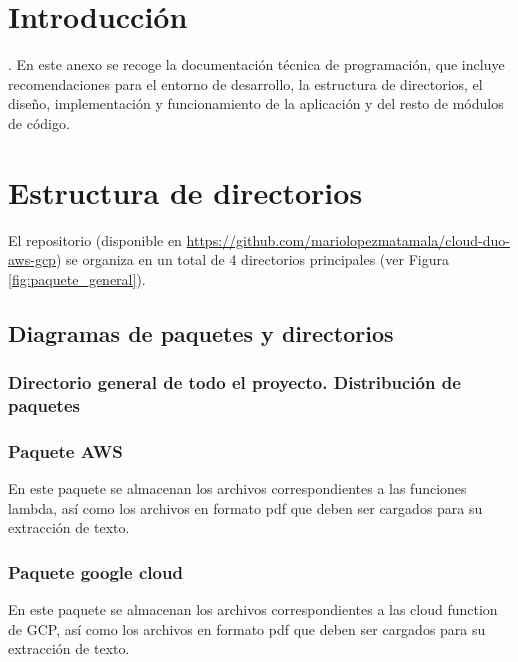 
\section{Introducción}. 
 En este anexo se recoge la documentación técnica de programación, que incluye recomendaciones para el entorno de desarrollo, la estructura de directorios,  el diseño, implementación y funcionamiento de la aplicación y del resto de módulos de código.

\section{Estructura de directorios}
El repositorio (disponible en \url{https://github.com/mariolopezmatamala/cloud-duo-aws-gcp}) se organiza en un total de 4 directorios principales (ver Figura \ref{fig:paquete_general}).

\subsection{Diagramas de paquetes y directorios}

\subsubsection{Directorio general de todo el proyecto. Distribución de paquetes}


\subsubsection{Paquete AWS}
En este paquete se almacenan los archivos correspondientes a las funciones lambda, así como los archivos en formato pdf que deben ser cargados para su extracción de texto.


\subsubsection{Paquete google cloud}

En este paquete se almacenan los archivos correspondientes a las cloud function de GCP, así como los archivos en formato pdf que deben ser cargados para su extracción de texto.


